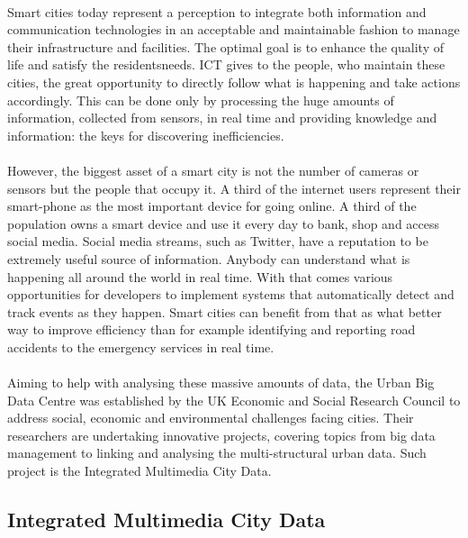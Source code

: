 \documentclass{l4proj}
\begin{document}
\paragraph{}
Smart cities today represent a perception to integrate both information and communication technologies in an acceptable and maintainable fashion to manage their infrastructure and facilities. The optimal goal is to enhance the quality of life and satisfy the residents\textquotesingle  needs. ICT gives to the people, who maintain these cities, the great opportunity to directly follow what is happening and take actions accordingly. This can be done only by processing the huge amounts of information, collected from sensors, in real time and providing knowledge and information: the keys for discovering inefficiencies. 
\paragraph{}
However, the biggest asset of a smart city is not the number of cameras or sensors but the people that occupy it. A third of the internet users\cite{ofcomreport1} represent their smart-phone as the most important device for going online. A third of the population owns a smart device and use it every day to bank, shop and access social media. Social media streams, such as Twitter, have a reputation to be extremely useful source of information. Anybody can understand what is happening all around the world in real time. With that comes various opportunities for developers to implement systems that automatically detect and track events as they happen. Smart cities can benefit from that as what better way to improve efficiency than for example identifying and reporting road accidents to the emergency services in real time.
\paragraph{}
Aiming to help with analysing these massive amounts of data, the Urban Big Data Centre was established by the UK Economic and Social Research Council to address social, economic and environmental challenges facing cities. Their researchers are undertaking innovative projects, covering topics from big data management to linking and analysing the multi-structural urban data.  Such project is the Integrated Multimedia City Data. 



\subsection{Integrated Multimedia City Data}
\end{document}
